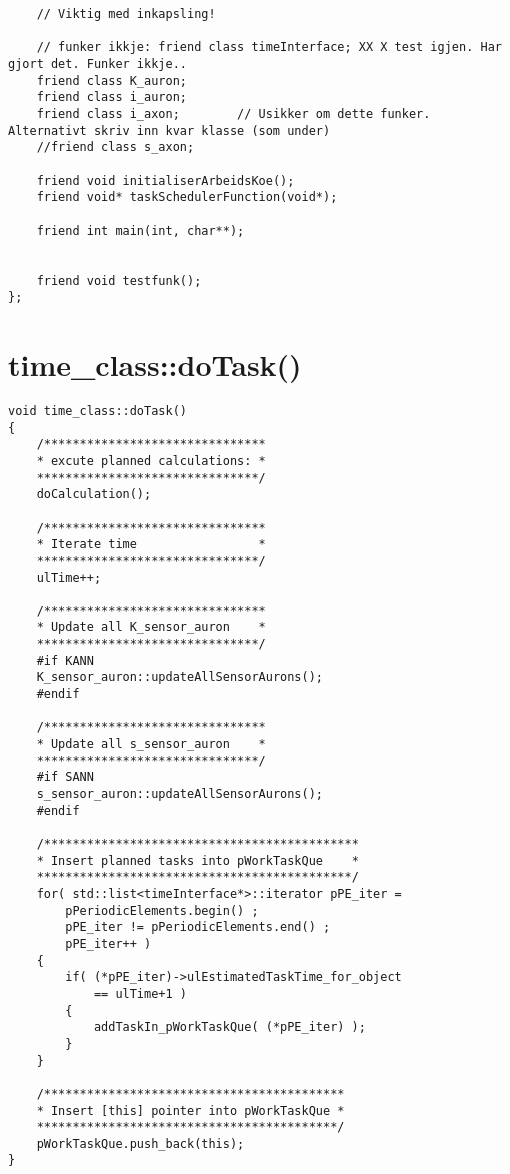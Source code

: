 \begin{lstlisting}
	// Viktig med inkapsling!

	// funker ikkje: friend class timeInterface; XX X test igjen. Har gjort det. Funker ikkje..
	friend class K_auron;
	friend class i_auron;
	friend class i_axon; 		// Usikker om dette funker. Alternativt skriv inn kvar klasse (som under)
	//friend class s_axon;

	friend void initialiserArbeidsKoe();
	friend void* taskSchedulerFunction(void*);
	
	friend int main(int, char**);


	friend void testfunk();
};

\end{lstlisting}














\section{time\_class::doTask()}
\label{appendixTimeClassDoTask}
\begin{lstlisting}
void time_class::doTask()
{
	/*******************************
	* excute planned calculations: *
	*******************************/
	doCalculation();

	/*******************************
	* Iterate time 				   *
	*******************************/
	ulTime++;

	/*******************************
	* Update all K_sensor_auron    *
	*******************************/
	#if KANN
	K_sensor_auron::updateAllSensorAurons();
	#endif

	/*******************************
	* Update all s_sensor_auron    *
	*******************************/
	#if SANN
	s_sensor_auron::updateAllSensorAurons();
	#endif

	/********************************************
	* Insert planned tasks into pWorkTaskQue    *
	********************************************/
	for( std::list<timeInterface*>::iterator pPE_iter = 
		pPeriodicElements.begin() ; 
		pPE_iter != pPeriodicElements.end()	; 
		pPE_iter++ )
	{
		if( (*pPE_iter)->ulEstimatedTaskTime_for_object 
			== ulTime+1 )
		{
			addTaskIn_pWorkTaskQue( (*pPE_iter) );
		}
 	}

	/******************************************
	* Insert [this] pointer into pWorkTaskQue *
	******************************************/
	pWorkTaskQue.push_back(this);	
}
\end{lstlisting}
